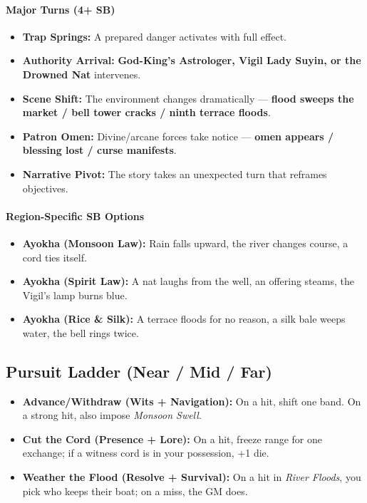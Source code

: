 \paragraph{Major Turns (4+ SB)}
\begin{itemize}
\item \textbf{Trap Springs:} A prepared danger activates with full effect.
\item \textbf{Authority Arrival:} \textbf{God-King's Astrologer, Vigil Lady Suyin, or the Drowned Nat} intervenes.
\item \textbf{Scene Shift:} The environment changes dramatically --- \textbf{flood sweeps the market / bell tower cracks / ninth terrace floods}.
\item \textbf{Patron Omen:} Divine/arcane forces take notice --- \textbf{omen appears / blessing lost / curse manifests}.
\item \textbf{Narrative Pivot:} The story takes an unexpected turn that reframes objectives.
\end{itemize}

\paragraph{Region-Specific SB Options}
\begin{itemize}
\item \textbf{Ayokha (Monsoon Law):} Rain falls upward, the river changes course, a cord ties itself.
\item \textbf{Ayokha (Spirit Law):} A nat laughs from the well, an offering steams, the Vigil's lamp burns blue.
\item \textbf{Ayokha (Rice \& Silk):} A terrace floods for no reason, a silk bale weeps water, the bell rings twice.
\end{itemize}

\subsection*{Pursuit Ladder (Near / Mid / Far)}
\begin{itemize}
\item \textbf{Advance/Withdraw (Wits + Navigation):} On a hit, shift one band. On a strong hit, also impose \emph{Monsoon Swell}.
\item \textbf{Cut the Cord (Presence + Lore):} On a hit, freeze range for one exchange; if a witness cord is in your possession, +1 die.
\item \textbf{Weather the Flood (Resolve + Survival):} On a hit in \emph{River Floods}, you pick who keeps their boat; on a miss, the GM does.
\end{itemize}

